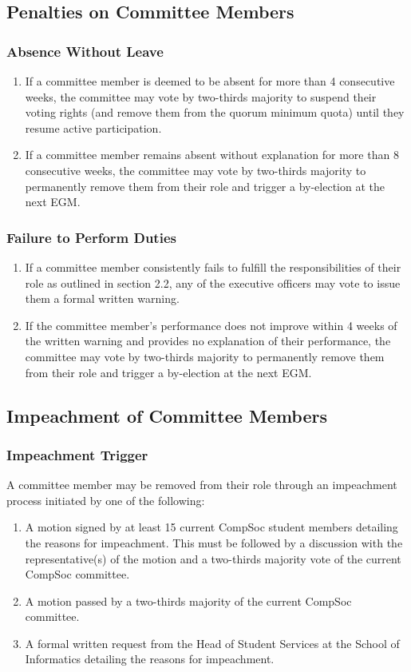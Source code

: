 \subsection{Penalties on Committee Members}
\subsubsection{Absence Without Leave}
\begin{enumerate}
\item If a committee member is deemed to be absent for more than 4 consecutive weeks, the committee may vote by two-thirds majority to suspend their voting rights (and remove them from the quorum minimum quota) until they resume active participation.
\item If a committee member remains absent without explanation for more than 8 consecutive weeks, the committee may vote by two-thirds majority to permanently remove them from their role and trigger a by-election at the next EGM.
\end{enumerate}

\subsubsection{Failure to Perform Duties}
\begin{enumerate}
\item If a committee member consistently fails to fulfill the responsibilities of their role as outlined in section 2.2, any of the executive officers may vote to issue them a formal written warning.
\item If the committee member's performance does not improve within 4 weeks of the written warning and provides no explanation of their performance, the committee may vote by two-thirds majority to permanently remove them from their role and trigger a by-election at the next EGM.
\end{enumerate}

\subsection{Impeachment of Committee Members}
\subsubsection{Impeachment Trigger}
A committee member may be removed from their role through an impeachment process initiated by one of the following:
\begin{enumerate}
\item A motion signed by at least 15 current CompSoc student members detailing the reasons for impeachment. This must be followed by a discussion with the representative(s) of the motion and a two-thirds majority vote of the current CompSoc committee.
\item A motion passed by a two-thirds majority of the current CompSoc committee.
\item A formal written request from the Head of Student Services at the School of Informatics detailing the reasons for impeachment.
\end{enumerate}

